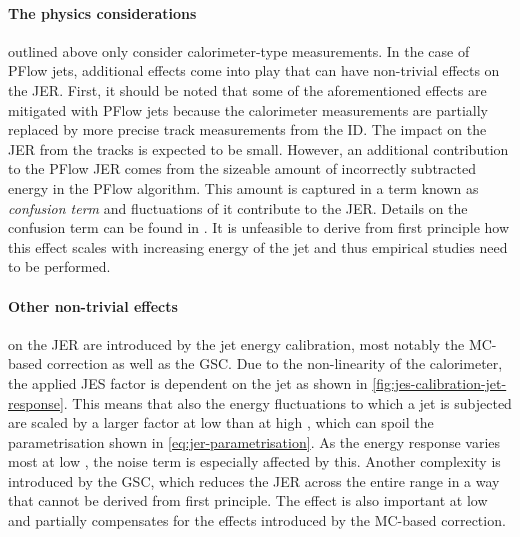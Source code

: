 \paragraph{The physics considerations} outlined above only consider calorimeter-type measurements.
In the case of PFlow jets, additional effects come into play that can have non-trivial effects on the JER.
First, it should be noted that some of the aforementioned effects are mitigated with PFlow jets because the calorimeter measurements are partially replaced by more precise track measurements from the ID. 
The impact on the JER from the tracks is expected to be small.
However, an additional contribution to the PFlow JER comes from the sizeable amount of incorrectly subtracted energy in the PFlow algorithm.
This amount is captured in a term known as \emph{confusion term} and fluctuations of it contribute to the JER. Details on the confusion term can be found in . It is unfeasible to derive from first principle how this effect scales with increasing energy of the jet and thus empirical studies need to be performed.

\paragraph{Other non-trivial effects} on the JER are introduced by the jet energy calibration, most notably the MC-based correction as well as the GSC.
Due to the non-linearity of the calorimeter, the applied JES factor is dependent on the jet \pT as shown in \cref{fig:jes-calibration-jet-response}. This means that also the energy fluctuations to which a jet is subjected are scaled by a larger factor at low \pT than at high \pT, which can spoil the parametrisation shown in \cref{eq:jer-parametrisation}.
As the energy response varies most at low \pT, the noise term is especially affected by this.
Another complexity is introduced by the GSC, which reduces the JER across the entire \pT range in a way that cannot be derived from first principle. The effect is also important at low \pT and partially compensates for the effects introduced by the MC-based correction.

